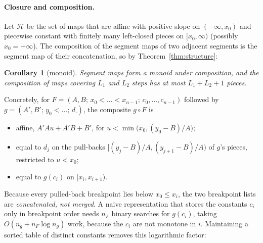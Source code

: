 \documentclass[10pt]{article}
\newtheorem{corollary}[theorem]{Corollary}
\theoremstyle{remark}
\begin{document}
\paragraph{Closure and composition.}
Let $\mathcal H$ be the set of maps that are affine with positive slope on $(-\infty,x_0)$ and piecewise constant with finitely many left-closed pieces on $[x_0,\infty)$ (possibly $x_0=+\infty$). The composition of the segment maps of two adjacent segments is the segment map of their concatenation, so by Theorem~\ref{thm:structure}:

\begin{corollary}[monoid]
Segment maps form a monoid under composition, and the composition of maps covering $L_1$ and $L_2$ steps has at most $L_1+L_2+1$ pieces.
\end{corollary}

Concretely, for $F=(A,B;\,x_0<\dots<x_{n-1};\,c_0,\dots,c_{n-1})$ followed by $g=(A',B';\,y_0<\dots;\,d_\cdot)$, the composite $g\circ F$ is
\begin{itemize}
\item affine, $A'A u+A'B+B'$, for $u<\min\big(x_0,(y_0-B)/A\big)$;
\item equal to $d_j$ on the pull-backs $[(y_j-B)/A,(y_{j+1}-B)/A)$ of $g$'s pieces, restricted to $u<x_0$;
\item equal to $g(c_i)$ on $[x_i,x_{i+1})$.
\end{itemize}
Because every pulled-back breakpoint lies below $x_0\le x_i$, the two breakpoint lists are \emph{concatenated, not merged}. A naive representation that stores the constants $c_i$ only in breakpoint order needs $n_F$ binary searches for $g(c_i)$, taking $O(n_g+n_F\log n_g)$ work, because the $c_i$ are not monotone in $i$. Maintaining a sorted table of distinct constants removes this logarithmic factor:
\end{document}
